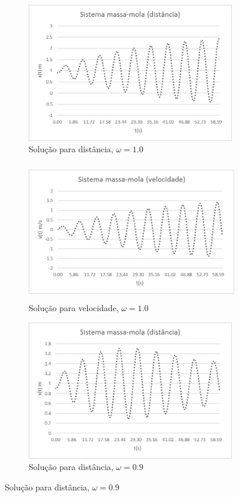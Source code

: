 \documentclass[12pt,fleqn]{article}
\begin{document}
\begin{figure}[h]
\begin{subfigure}{0.5\textwidth}
\includegraphics[width=1.0\linewidth, height=6cm]{distancia} 
\caption{Solução para distância, $\omega=1.0$}
\label{fig:subim1}
\end{subfigure}
\begin{subfigure}{0.5\textwidth}
\includegraphics[width=1.0\linewidth, height=6cm]{velocidade}
\caption{Solução para velocidade, $\omega=1.0$}
\label{fig:subim2}
\end{subfigure}
\begin{subfigure}{0.5\textwidth}
\includegraphics[width=1.0\linewidth, height=6cm]{distancia2} 
\caption{Solução para distância, $\omega=0.9$}
\label{fig:subim3}
\end{subfigure}

\end{figure}
\end{document}
